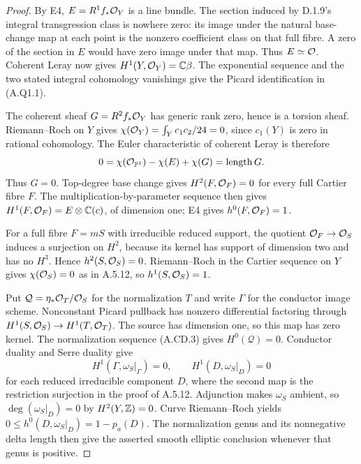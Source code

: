 \begin{proof}
By E4, $E=R^1f_*\mathcal O_Y$ is a line bundle. The section
induced by D.1.9's integral transgression class is
nowhere zero: its image under the natural base-change
map at each point is the nonzero coefficient class on
that full fibre. A zero of the section in $E$ would
have zero image under that map. Thus $E\simeq\mathcal O$.
Coherent Leray now gives $H^1(Y,\mathcal O_Y)=\mathbb C\beta$.
The exponential sequence and the two stated integral
cohomology vanishings give the Picard identification
in (A.Q1.1).

The coherent sheaf $G=R^2f_*\mathcal O_Y$ has generic rank
zero, hence is a torsion sheaf. Riemann--Roch on $Y$
gives $\chi(\mathcal O_Y)=\int_Yc_1c_2/24=0$, since
$c_1(Y)$ is zero in rational cohomology. The Euler
characteristic of coherent Leray is therefore
\[
 0=\chi(\mathcal O_{\mathbb P^1})-\chi(E)+\chi(G)
      =\operatorname{length}G.
\]
Thus $G=0$. Top-degree base change gives
$H^2(F,\mathcal O_F)=0$ for every full Cartier fibre $F$.
The multiplication-by-parameter sequence then gives
$H^1(F,\mathcal O_F)=E\otimes\mathbb C(c)$, of dimension one;
E4 gives $h^0(F,\mathcal O_F)=1$.

For a full fibre $F=mS$ with irreducible reduced
support, the quotient $\mathcal O_F\to\mathcal O_S$ induces a
surjection on $H^2$, because its kernel has support
of dimension two and has no $H^3$.
Hence $h^2(S,\mathcal O_S)=0$. Riemann--Roch in the Cartier
sequence on $Y$ gives $\chi(\mathcal O_S)=0$ as in A.5.12,
so $h^1(S,\mathcal O_S)=1$.

Put $\mathcal Q=\eta_*\mathcal O_T/\mathcal O_S$ for the
normalization $T$ and write $\Gamma$ for the conductor
image scheme. Nonconstant Picard pullback has nonzero
differential factoring through
$H^1(S,\mathcal O_S)\to H^1(T,\mathcal O_T)$.
The source has dimension one, so this map has zero
kernel. The normalization sequence (A.CD.3) gives
$H^0(\mathcal Q)=0$. Conductor duality and Serre
duality give
\[
 H^1(\Gamma,\omega_S|_\Gamma)=0,
 \qquad H^1(D,\omega_S|_D)=0                      \tag{A.Q1.2}
\]
for each reduced irreducible component $D$, where
the second map is the restriction surjection in the
proof of A.5.12. Adjunction makes $\omega_S$ ambient,
so $\deg(\omega_S|_D)=0$ by $H^2(Y,\mathbb Z)=0$.
Curve Riemann--Roch yields
$0\le h^0(D,\omega_S|_D)=1-p_a(D)$.
The normalization genus and its nonnegative delta
length then give the asserted smooth elliptic
conclusion whenever that genus is positive.
\end{proof}




